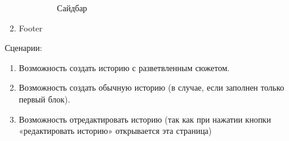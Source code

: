 \documentclass[a4paper]{article}
\begin{document}
\begin{enumerate}
\begin{enumerate}
\begin{figure}[h]
						\caption{Сайдбар}
					\end{figure}
				\end{enumerate}
				\item Footer
			\end{enumerate}
			\large{Сценарии:}
				\begin{enumerate}
					\item Возможность создать историю с разветвленным сюжетом.
					\item Возможность создать обычную историю (в случае, если заполнен только первый блок).
					\item Возможность отредактировать историю (так как при нажатии кнопки «редактировать историю» открывается эта страница)
				\end{enumerate}
		\newpage
\end{document}
